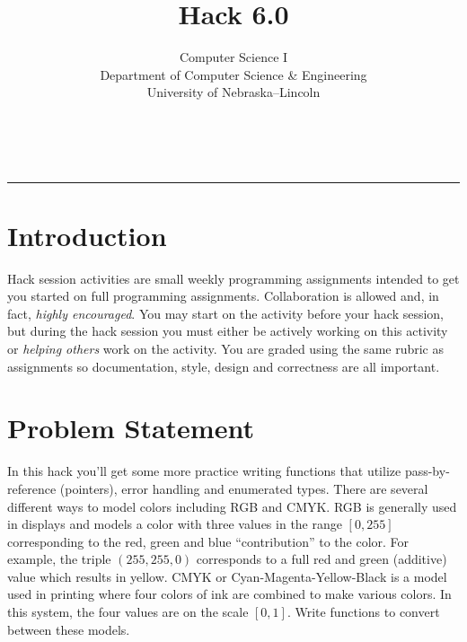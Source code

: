 \documentclass[12pt]{scrartcl}
\title{Hack 6.0}\let\Title\@title
\subtitle{Computer Science I\\
{\small
\vskip1cm
Department of Computer Science \& Engineering \\
University of Nebraska--Lincoln}
\vskip-1cm}
\date{~}
\begin{document}
\maketitle

\hrule

\section*{Introduction}

Hack session activities are small weekly programming assignments intended
to get you started on full programming assignments.  Collaboration is allowed
and, in fact, \emph{highly encouraged}.  You may start on the activity before
your hack session, but during the hack session you must either be actively 
working on this activity or \emph{helping others} work on the activity.
You are graded using the same rubric as assignments so documentation, style, 
design and correctness are all important.  

\section*{Problem Statement}

In this hack you'll get some more practice writing functions that utilize 
pass-by-reference (pointers), error handling and enumerated types.  There 
are several different
ways to model colors including RGB and CMYK.  RGB is generally used in displays
and models a color with three values in the range $[0, 255]$ corresponding to 
the red, green and blue ``contribution'' to the color.  For example, the
triple $(255, 255, 0)$ corresponds to a full red and green (additive) value
which results in yellow.  CMYK or Cyan-Magenta-Yellow-Black is a model used
in printing where four colors of ink are combined to make various colors.
In this system, the four values are on the scale $[0, 1]$.  Write 
functions to convert between these models.
\end{document}

